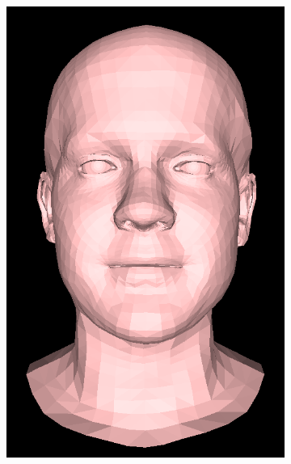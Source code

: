 \begin{figure}[h!]
\begin{subfigure}[b]{0.19\textwidth}
        \includegraphics[width=\textwidth]{figures/gen_sample/00037.png}
    \end{subfigure}
    \begin{subfigure}[b]{0.19\textwidth}

\end{subfigure}
\end{figure}
